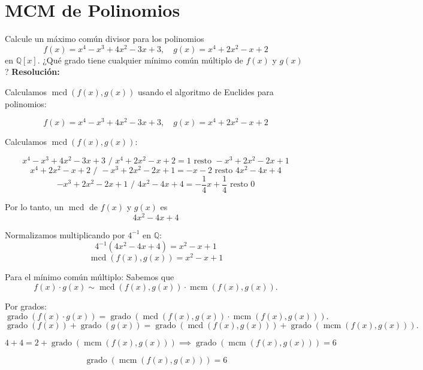 \documentclass[a4paper,12pt]{article}
\begin{document}
\section{MCM de Polinomios}

\begin{ejercicio}[title=Ejercicio 44]
Calcule un máximo común divisor para los polinomios
\[
f(x) = x^4 - x^3 + 4x^2 - 3x + 3, \quad g(x) = x^4 + 2x^2 - x + 2
\]
en $\mathbb{Q}[x]$.  
¿Qué grado tiene cualquier mínimo común múltiplo de $f(x)$ y $g(x)$?
\tcblower
\textbf{Resolución:}

Calculamos $\operatorname{mcd}(f(x), g(x))$ usando el algoritmo de Euclides para polinomios:

\[
f(x) = x^4 - x^3 + 4x^2 - 3x + 3, \quad g(x) = x^4 + 2x^2 - x + 2
\]

Calculamos $\operatorname{mcd}(f(x), g(x))$:

\[
x^4 - x^3 + 4x^2 - 3x + 3 \text{ / } x^4 + 2x^2 - x + 2 = 1 \text{ resto } -x^3 + 2x^2 - 2x + 1
\]
\[
x^4 + 2x^2 - x + 2 \text{ / } -x^3 + 2x^2 - 2x + 1 = -x-2 \text{ resto } 4x^2 -4x +4
\]
\[
-x^3 + 2x^2 - 2x + 1 \text{ / } 4x^2 -4x +4 = -\frac{1}{4}x + \frac{1}{4} \text{ resto } 0
\]

Por lo tanto, un $\operatorname{mcd}$ de $f(x)$ y $g(x)$ es
\[
4x^2 -4x +4
\]

Normalizamos multiplicando por $4^{-1}$ en $\mathbb{Q}$:
\[
4^{-1} (4x^2 - 4x + 4) = x^2 - x + 1
\]
\[
\boxed{\operatorname{mcd}(f(x), g(x)) = x^2 - x + 1}
\]

\vspace{0.5em}

Para el mínimo común múltiplo: Sabemos que
\[
f(x) \cdot g(x) \sim \operatorname{mcd}(f(x), g(x)) \cdot \operatorname{mcm}(f(x), g(x)).
\]

Por grados:
\[
\operatorname{grado}(f(x) \cdot g(x)) = \operatorname{grado}(\operatorname{mcd}(f(x), g(x)) \cdot \operatorname{mcm}(f(x), g(x))).
\]
\[
\operatorname{grado}(f(x)) + \operatorname{grado}(g(x)) = \operatorname{grado}(\operatorname{mcd}(f(x), g(x))) + \operatorname{grado}(\operatorname{mcm}(f(x), g(x))).
\]

\[
4 + 4 = 2 + \operatorname{grado}(\operatorname{mcm}(f(x), g(x))) \implies \operatorname{grado}(\operatorname{mcm}(f(x), g(x))) = 6
\]

\[
\boxed{\operatorname{grado}(\operatorname{mcm}(f(x), g(x))) = 6}
\]

\end{ejercicio}
\end{document}
